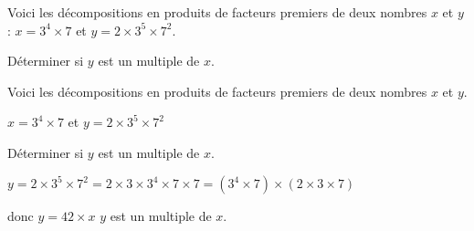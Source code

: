 \begin{exercice*}
    Voici les décompositions en produits de facteurs premiers de deux nombres $x$ et $y$ : $x=3^4\times 7$ et $y=2\times 3^5\times 7^2$.
    
    Déterminer si $y$ est un multiple de $x$.
\end{exercice*}
\begin{corrige}
    Voici les décompositions en produits de facteurs premiers de deux nombres $x$ et $y$.

    $x=3^4\times 7$ et $y=2\times 3^5\times 7^2$

    \smallskip
    Déterminer si $y$ est un multiple de $x$.

    $y=2\times 3^5\times 7^2 = 2\times 3\times 3^4\times 7\times 7 = (3^4\times 7)\times (2\times 3\times 7)$

    donc $y=42\times x$ $y$ est un multiple de $x$.
\end{corrige}

